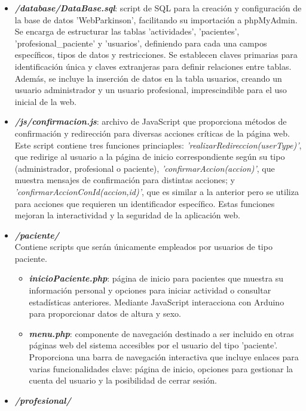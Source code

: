 \begin{itemize}
\begin{itemize}
\begin{itemize}
        \end{itemize}
        \item \textbf{\textit{/database/DataBase.sql}}: script de SQL para la creación y configuración de la base de datos 'WebParkinson', facilitando su importación a phpMyAdmin. Se encarga de estructurar las tablas 'actividades', 'pacientes', 'profesional\_paciente' y 'usuarios', definiendo para cada una campos específicos, tipos de datos y restricciones. Se establecen claves primarias para identificación única y claves extranjeras para definir relaciones entre tablas. Además, se incluye la inserción de datos en la tabla usuarios, creando un usuario administrador y un usuario profesional, imprescindible para el uso inicial de la web.
        \item \textbf{\textit{/js/confirmacion.js}}: archivo de JavaScript que proporciona métodos de confirmación y redirección para diversas acciones críticas de la página web. Este script contiene tres funciones princiaples: \textit{'realizarRedireccion(userType)'}, que redirige al usuario a la página de inicio correspondiente según su tipo (administrador, profesional o paciente), \textit{'confirmarAccion(accion)'}, que muestra mensajes de confirmación para distintas acciones; y \textit{'confirmarAccionConId(accion,id)'}, que es similar a la anterior pero se utiliza para acciones que requieren un identificador específico. Estas funciones mejoran la interactividad y la seguridad de la aplicación web.
        \item \textbf{\textit{/paciente/}}\\
        Contiene scripts que serán únicamente empleados por usuarios de tipo paciente.
        \begin{itemize}
            \item \textbf{\textit{inicioPaciente.php}}: página de inicio para pacientes que muestra su información personal y opciones para iniciar actividad o consultar estadísticas anteriores. Mediante JavaScript interacciona con Arduino para proporcionar datos de altura y sexo.
            \item \textbf{\textit{menu.php}}: componente de navegación destinado a ser incluido en otras páginas web del sistema accesibles por el usuario del tipo 'paciente'. Proporciona una barra de navegación interactiva que incluye enlaces para varias funcionalidades clave: página de inicio, opciones para gestionar la cuenta del usuario y la posibilidad de cerrar sesión.
        \end{itemize}
        \item \textbf{\textit{/profesional/}}\\

\end{itemize}
\end{itemize}
